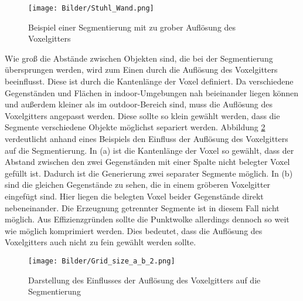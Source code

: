 \begin{figure}
	\centering
	\texttt{[image: Bilder/Stuhl\_Wand.png]}
	\caption{Beispiel einer Segmentierung mit zu grober Auflösung des Voxelgitters}
	\label{fig:Übersprung}
\end{figure}


Wie groß die Abstände zwischen Objekten sind, die bei der Segmentierung übersprungen werden, wird zum Einen durch die Auflösung des Voxelgitters beeinflusst. Diese ist durch die Kantenlänge der Voxel definiert. Da verschiedene Gegenständen und Flächen in indoor-Umgebungen nah beieinander liegen können und außerdem kleiner als im outdoor-Bereich sind, muss die Auflösung des Voxelgitters angepasst werden. Diese sollte so klein gewählt werden, dass die Segmente verschiedene Objekte möglichst separiert werden. Abbildung \ref{fig:Voxel} verdeutlicht anhand eines Beispiels den Einfluss der Auflösung des Voxelgitters auf die Segmentierung. In (a) ist die Kantenlänge der Voxel so gewählt, dass der Abstand zwischen den zwei Gegenständen mit einer Spalte nicht belegter Voxel gefüllt ist. Dadurch ist die Generierung zwei separater Segmente möglich. In (b) sind die gleichen Gegenstände zu sehen, die in einem gröberen Voxelgitter eingefügt sind. Hier liegen die belegten Voxel beider Gegenstände direkt nebeneinander. Die Erzeugnung getrennter Segmente ist in diesem Fall nicht möglich. Aus Effizienzgründen sollte die Punktwolke allerdings dennoch so weit wie möglich komprimiert werden. Dies bedeutet, dass die Auflösung des Voxelgitters auch nicht zu fein gewählt werden sollte.  

\begin{figure}
	\centering
	\texttt{[image: Bilder/Grid\_size\_a\_b\_2.png]}
	\caption{Darstellung des Einflusses der Auflösung des Voxelgitters auf die Segmentierung}
	\label{fig:Voxel}
\end{figure}


